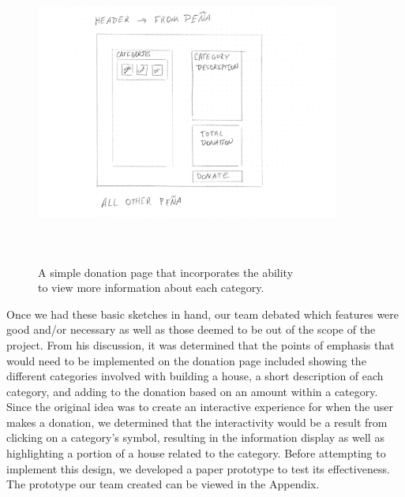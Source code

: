 \documentclass[letter]{article}
\begin{document}
\begin{figure}[H]
	\includegraphics[width=10cm, height=10cm]{Example5}
	\captionsetup{justification=centering}
	\centering
	\caption{A simple donation page that incorporates the ability \\ to view more information about each category.}
	\label{fig:3}
\end{figure}

Once we had these basic sketches in hand, our team debated which
features were good and/or necessary as well as those deemed to be out
of the scope of the project. From his discussion, it was determined
that the points of emphasis that would need to be implemented on the
donation page included showing the different categories involved with
building a house, a short description of each category, and adding to
the donation based on an amount within a category. Since the original
idea was to create an interactive experience for when the user makes a
donation, we determined that the interactivity would be a result from
clicking on a category's symbol, resulting in the information display
as well as highlighting a portion of a house related to the
category.
 Before attempting to implement this design, we developed a
paper prototype to test its effectiveness. 
The prototype our team
created can be viewed in the Appendix.
\end{document}
